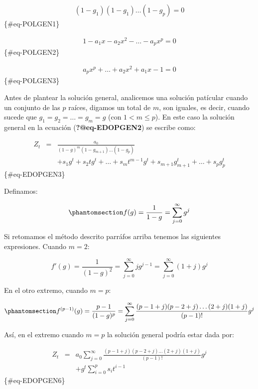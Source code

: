 \documentclass[
  a4paper,
]{article}
\begin{document}
\begin{eqnarray}
    (1 - g_1)(1 - g_1) \ldots (1 - g_p) = 0
\end{eqnarray} \{\#eq-POLGEN1\}

\begin{eqnarray}
    1 - a_1 x - a_2 x^2 - \ldots - a_p x^p = 0
\end{eqnarray} \{\#eq-POLGEN2\}

\begin{eqnarray}
    a_p x^p + \ldots + a_2 x^2 + a_1 x - 1 = 0
\end{eqnarray} \{\#eq-POLGEN3\}

Antes de plantear la solución general, analicemos una solución patícular
cuando un conjunto de las \(p\) raíces, digamos un total de \(m\), son
iguales, es decir, cuando sucede que \(g_1 = g_2 = \ldots = g_m = g\)
(con \(1 < m \leq p\)). En este caso la solución general en la ecuación
(\textbf{?@eq-EDOPGEN2}) se escribe como:

\begin{eqnarray}
    Z_t & = & \frac{a_0}{(1 - g)^m(1 - g_{m+1}) \ldots (1 - g_p)} \nonumber \\ 
    & & + s_1 g^t + s_2 t g^t + \ldots + s_m t^{m-1} g^t + s_{m+1} g^t_{m+1} + \ldots + s_{p} g^t_{p}
\end{eqnarray} \{\#eq-EDOPGEN3\}

Definamos:

\begin{equation}\phantomsection\label{eq-EDOPGEN4}{
    f(g) = \frac{1}{1 - g} = \sum_{j = 0}^{\infty} g^j
}\end{equation}

Si retomamos el método descrito parráfos arriba tenemos las siguientes
expresiones. Cuando \(m = 2\):

\[
    f'(g) = \frac{1}{(1 - g)^2} = \sum_{j = 0}^{\infty} j g^{j-1} = \sum_{j = 0}^{\infty} (1 + j) g^j \nonumber
\]

En el otro extremo, cuando \(m = p\):

\begin{equation}\phantomsection\label{eq-EDOPGEN5}{
    f^{(p-1)}(g) = \frac{p-1}{(1 - g)^p} = \sum_{j = 0}^{\infty} \frac{(p-1+j)(p-2+j) \ldots (2+j)(1+j)}{(p-1)!} g^j
}\end{equation}

Así, en el extremo cuando \(m = p\) la solución general podría estar
dada por:

\begin{eqnarray}
    Z_t & = & a_0 \sum_{j = 0}^{\infty} \frac{(p-1+j)(p-2+j) \ldots (2+j)(1+j)}{(p-1)!} g^j \nonumber \\
    & & + g^t \sum_{i = 0}^p s_i t^{i-1}
\end{eqnarray} \{\#eq-EDOPGEN6\}
\end{document}
